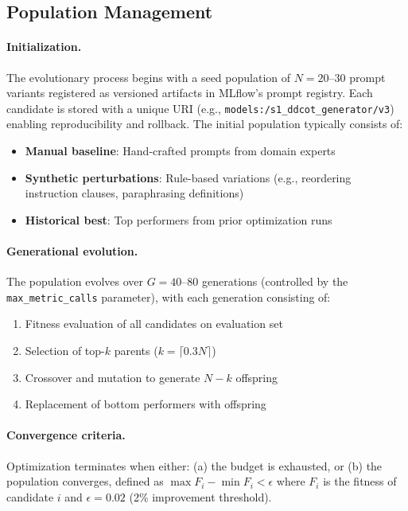 \documentclass[11pt]{article}
\begin{document}
\subsection{Population Management}

\paragraph{Initialization.} The evolutionary process begins with a seed population of $N = 20$--$30$ prompt
variants registered as versioned artifacts in MLflow's prompt registry. Each
candidate is stored with a unique URI (e.g.,
\texttt{models:/s1\_ddcot\_generator/v3}) enabling reproducibility and
rollback. The initial population typically consists of:

\begin{itemize}[noitemsep]
	\item \textbf{Manual baseline}: Hand-crafted prompts from domain experts
	\item \textbf{Synthetic perturbations}: Rule-based variations (e.g., reordering instruction clauses, paraphrasing definitions)
	\item \textbf{Historical best}: Top performers from prior optimization runs
\end{itemize}

\paragraph{Generational evolution.} The population evolves over $G = 40$--$80$ generations (controlled by the
\texttt{max\_metric\_calls} parameter), with each generation consisting of:
\begin{enumerate}[noitemsep]
	\item Fitness evaluation of all candidates on evaluation set
	\item Selection of top-$k$ parents ($k = \lceil 0.3N \rceil$)
	\item Crossover and mutation to generate $N - k$ offspring
	\item Replacement of bottom performers with offspring
\end{enumerate}

\paragraph{Convergence criteria.} Optimization terminates when either: (a) the budget is exhausted, or (b) the
population converges, defined as $\max F_i - \min F_i < \epsilon$ where $F_i$
is the fitness of candidate $i$ and $\epsilon = 0.02$ (2\% improvement
threshold).
\end{document}
